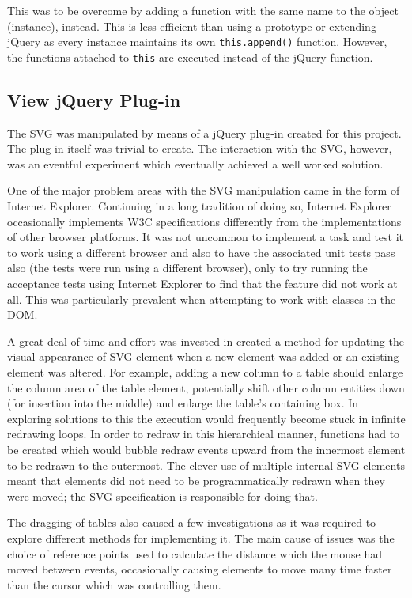 This was to be overcome by adding a function with the same name to the object (instance), instead. This is less efficient than using a prototype or extending jQuery as every instance maintains its own \texttt{this.append()} function. However, the functions attached to \texttt{this} are executed instead of the jQuery function.

\subsection{View jQuery Plug-in}
The SVG was manipulated by means of a jQuery plug-in created for this project. The plug-in itself was trivial to create. The interaction with the SVG, however, was an eventful experiment which eventually achieved a well worked solution.

One of the major problem areas with the SVG manipulation came in the form of Internet Explorer. Continuing in a long tradition of doing so, Internet Explorer occasionally implements W3C specifications differently from the implementations of other browser platforms. It was not uncommon to implement a task and test it to work using a different browser and also to have the associated unit tests pass also (the tests were run using a different browser), only to try running the acceptance tests using Internet Explorer to find that the feature did not work at all. This was particularly prevalent when attempting to work with classes in the DOM.

A great deal of time and effort was invested in created a method for updating the visual appearance of SVG element when a new element was added or an existing element was altered. For example, adding a new column to a table should enlarge the column area of the table element, potentially shift other column entities down (for insertion into the middle) and enlarge the table's containing box. In exploring solutions to this the execution would frequently become stuck in infinite redrawing loops. In order to redraw in this hierarchical manner, functions had to be created which would bubble redraw events upward from the innermost element to be redrawn to the outermost. The clever use of multiple internal SVG elements meant that elements did not need to be programmatically redrawn when they were moved; the SVG specification is responsible for doing that.

The dragging of tables also caused a few investigations as it was required to explore different methods for implementing it. The main cause of issues was the choice of reference points used to calculate the distance which the mouse had moved between events, occasionally causing elements to move many time faster than the cursor which was controlling them.

